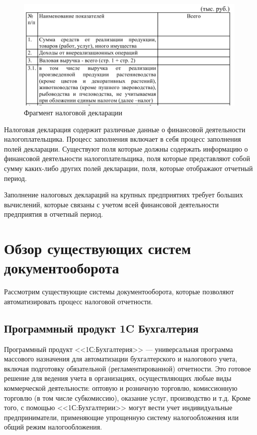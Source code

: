 \documentclass[14pt,a4paper]{reportmod}
\begin{document}
\begin{figure}
  \centering
  \includegraphics[scale=0.5]{pics/taxformrb_chunk}
  \caption{Фрагмент налоговой декларации}
  \label{pic:taxformrb}
\end{figure}


Налоговая декларация содержит различные данные о финансовой деятельности налогоплательщика. Процесс заполнения включает в себя процесс заполнения полей декларации. Существуют поля которые должны содержать информацию о финансовой деятельности налогоплательщика, поля которые представляют собой сумму каких-либо других полей декларации, поля, которые отображают отчетный период.

Заполнение налоговых деклараций на крупных предприятиях требует больших вычислений, которые связаны с учетом всей финансовой деятельности предприятия в отчетный период.
\section{Обзор существующих систем документооборота}
Рассмотрим существующие системы документооборота, которые позволяют автоматизировать процесс налоговой отчетности.
\subsection{Программный продукт 1C Бухгалтерия}
Программный продукт <<1С:Бухгалтерия>> — универсальная программа массового назначения для автоматизации бухгалтерского и налогового учета, включая подготовку обязательной (регламентированной) отчетности. Это готовое решение для ведения учета в организациях, осуществляющих любые виды коммерческой деятельности: оптовую и розничную торговлю, комиссионную торговлю (в том числе субкомиссию), оказание услуг, производство и т.д. Кроме того, с помощью <<1С:Бухгалтерии>> могут вести учет индивидуальные предприниматели, применяющие упрощенную систему налогообложения или общий режим налогообложения.
\end{document}
